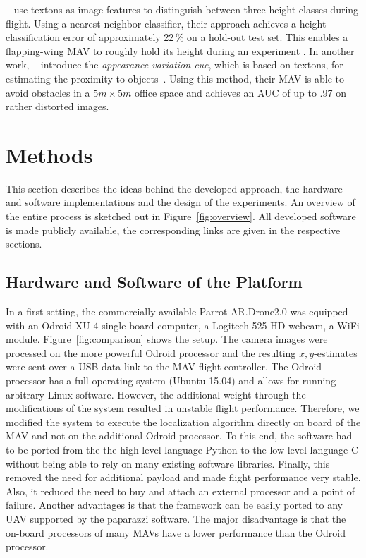 \documentclass{report}
\begin{document}
\citeauthor{de2009design}~\cite{de2009design} use textons as image
features to distinguish between three height classes during
flight. Using a nearest neighbor classifier, their approach achieves a
height classification error of approximately 22\,\% on a hold-out test
set.  This enables a flapping-wing MAV to roughly hold its height
during an experiment . In another work,
\citeauthor{de2012appearance}~\cite{de2012appearance} introduce the
\emph{appearance variation cue}, which is based on textons, for
estimating the proximity to objects~\cite{de2012appearance}.
Using this method, their MAV is able to avoid obstacles in a
$5m \times 5m$ office space and achieves an AUC of up to .97 on rather
distorted images.

\chapter{Methods}
\label{chap:methods}

This section describes the ideas behind the developed approach, the
hardware and software implementations and the design of the
experiments. An overview of the entire process is sketched out in
Figure~\ref{fig:overview}. All developed software is made publicly
available, the corresponding links are given in the respective
sections.

\section{Hardware and Software of the Platform}
\label{sec:hardware}

In a first setting, the commercially available Parrot AR.Drone2.0 was
equipped with an Odroid XU-4 single board computer, a Logitech 525 HD
webcam, a WiFi module. Figure~\ref{fig:comparison} shows the
setup. The camera images were processed on the more powerful Odroid
processor and the resulting $x,y$-estimates were sent over a USB data
link to the MAV flight controller. The Odroid processor has a full
operating system (Ubuntu 15.04) and allows for running arbitrary Linux
software.  However, the additional weight through the modifications of
the system resulted in unstable flight performance. Therefore, we
modified the system to execute the localization algorithm directly on
board of the MAV and not on the additional Odroid processor. To this
end, the software had to be ported from the the high-level language
Python to the low-level language C without being able to rely on many
existing software libraries.  Finally, this removed the need for
additional payload and made flight performance very stable. Also, it
reduced the need to buy and attach an external processor and a point
of failure. Another advantages is that the framework can be easily
ported to any UAV supported by the paparazzi software. The major
disadvantage is that the on-board processors of many MAVs have a lower
performance than the Odroid processor.
\end{document}
